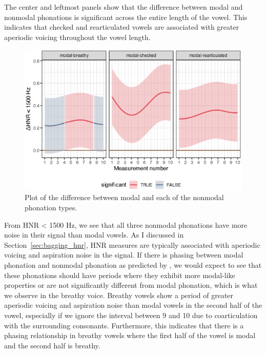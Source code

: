 The center and leftmost panels show that the difference between modal and nonmodal phonations is significant across the entire length of the vowel. This indicates that checked and rearticulated vowels are associated with greater aperiodic voicing throughout the vowel length.

\begin{figure}[h!]
    \centering
    \includegraphics[width = \linewidth]{images/LCH_GAMMs/hnr15_model_diff.eps}
    \caption{Plot of the difference between modal and each of the nonmodal phonation types.}
    \label{fig:hnr_model_diff}
\end{figure}

From HNR < 1500 Hz, we see that all three nonmodal phonations have more noise in their signal than modal vowels. As I discussed in Section~\ref{sec:bagging_hnr}, HNR measures are typically associated with aperiodic voicing and aspiration noise in the signal. If there is phasing between modal phonation and nonmodal phonation as predicted by \citet{silvermanLaryngealComplexityOtomanguean1997}, we would expect to see that these phonations should have periods where they exhibit more modal-like properties or are not significantly different from modal phonation, which is what we observe in the breathy voice. Breathy vowels show a period of greater aperiodic voicing and aspiration noise than modal vowels in the second half of the vowel, especially if we ignore the interval between 9 and 10 due to coarticulation with the surrounding consonants. Furthermore, this indicates that there is a phasing relationship in breathy vowels where the first half of the vowel is modal and the second half is breathy.
 
